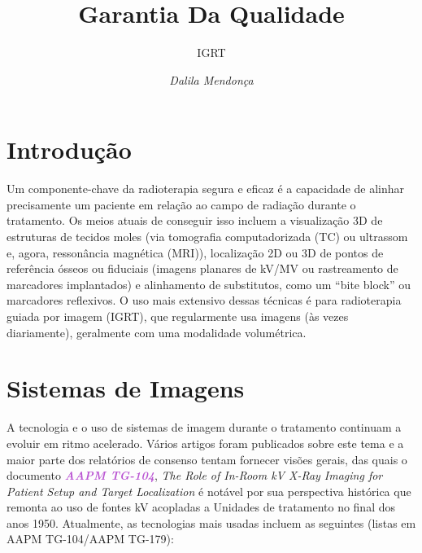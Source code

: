 \documentclass[11pt,a4paper]{article}
\title{\LobsterTwo\Huge{Garantia Da Qualidade}}
\author{\LobsterTwo\Large{IGRT}\nocite{*}}
\date{\LobsterTwo\textit{Dalila Mendonça}}
\begin{document}
	\maketitle

\section{Introdução}

    Um componente-chave da radioterapia segura e eficaz é a capacidade de alinhar precisamente um paciente em relação ao campo de radiação durante o tratamento. Os meios atuais de conseguir isso incluem a visualização 3D de estruturas de tecidos moles (via tomografia computadorizada (TC) ou ultrassom e, agora,  ressonância magnética (MRI)), localização 2D ou 3D de pontos de referência ósseos ou fiduciais (imagens planares de kV/MV ou rastreamento de marcadores implantados) e alinhamento de substitutos, como um ``bite block'' ou marcadores reflexivos. O uso mais extensivo dessas técnicas é para radioterapia guiada por imagem (IGRT), que regularmente usa imagens (às vezes diariamente), geralmente com uma modalidade volumétrica. 

\section{Sistemas de Imagens}

    A tecnologia e o uso de sistemas de imagem durante o tratamento continuam a evoluir em ritmo acelerado. Vários artigos foram publicados sobre este tema e a maior parte dos relatórios de consenso tentam fornecer visões gerais, das quais o documento \textcolor{MediumOrchid}{\textbf{\textit{AAPM TG-104}}}, \textit{The Role of In-Room kV X-Ray Imaging for Patient Setup and Target Localization} é notável por sua perspectiva histórica que remonta ao uso de fontes kV acopladas a Unidades de tratamento  no final dos anos 1950. Atualmente, as tecnologias mais usadas incluem as seguintes (listas em AAPM TG-104/AAPM TG-179):
\end{document}
